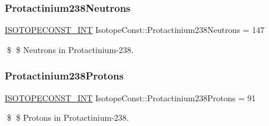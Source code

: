 \subsubsection{\texorpdfstring{Protactinium238\+Neutrons}{Protactinium238Neutrons}}
{\footnotesize\ttfamily \mbox{\hyperlink{group___isotope_const-_macros_ga5f18360b3e99483a35c32d789e62621c}{I\+S\+O\+T\+O\+P\+E\+C\+O\+N\+S\+T\+\_\+\+I\+NT}} Isotope\+Const\+::\+Protactinium238\+Neutrons = 147}

\$ \$ Neutrons in Protactinium-\/238. \mbox{\label{group___isotope_const-_protactinium-_pa238_ga0c898cacda382099604d3c9b7c72edbb}} 
\subsubsection{\texorpdfstring{Protactinium238\+Protons}{Protactinium238Protons}}
{\footnotesize\ttfamily \mbox{\hyperlink{group___isotope_const-_macros_ga5f18360b3e99483a35c32d789e62621c}{I\+S\+O\+T\+O\+P\+E\+C\+O\+N\+S\+T\+\_\+\+I\+NT}} Isotope\+Const\+::\+Protactinium238\+Protons = 91}

\$ \$ Protons in Protactinium-\/238. 